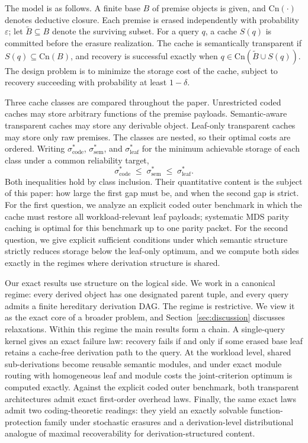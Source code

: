 \documentclass[journal]{IEEEtran}
\newcommand{\Cn}{\text{Cn}}
\numberwithin{equation}{section}
\begin{document}
The model is as follows.  A finite base \(B\) of premise objects is given,
and \(\Cn(\cdot)\) denotes deductive closure.  Each premise is erased
independently with probability \(\varepsilon\); let
\(\widetilde B\subseteq B\) denote the surviving subset.  For a query \(q\),
a cache \(S(q)\) is committed before the erasure realization.  The cache is
semantically transparent if \(S(q)\subseteq\Cn(B)\), and recovery is
successful exactly when \(q\in\Cn(\widetilde B\cup S(q))\).  The design
problem is to minimize the storage cost of the cache, subject to recovery
succeeding with probability at least \(1-\delta\).

Three cache classes are compared throughout the paper.  Unrestricted coded
caches may store arbitrary functions of the premise payloads.
Semantic-aware transparent caches may store any derivable object.
Leaf-only transparent caches may store only raw premises.  The classes are nested, so their optimal
costs are ordered.  Writing \(\sigma_{\mathrm{code}}^{*}\),
\(\sigma_{\mathrm{sem}}^{*}\), and \(\sigma_{\mathrm{leaf}}^{*}\) for the
minimum achievable storage of each class under a common reliability target,
\begin{equation}
  \sigma_{\mathrm{code}}^*
  \;\le\;
  \sigma_{\mathrm{sem}}^*
  \;\le\;
  \sigma_{\mathrm{leaf}}^*.
\label{eq:intro-three-way}
\end{equation}
Both inequalities hold by class inclusion.  Their quantitative content is the
subject of this paper: how large the first gap must be, and when the second
gap is strict.  For the first question, we analyze an explicit coded outer
benchmark in which the cache must restore all workload-relevant leaf
payloads; systematic MDS parity caching is optimal for this benchmark up to
one parity packet.  For the second question, we give explicit sufficient
conditions under which semantic structure strictly reduces storage below the
leaf-only optimum, and we compute both sides exactly in the regimes where
derivation structure is shared.

Our exact results use structure on the logical side.  We work in a canonical
regime: every derived object has one designated parent tuple, and every query
admits a finite hereditary derivation DAG.  The regime is restrictive.  We
view it as the exact core of a broader problem, and
Section~\ref{sec:discussion} discusses relaxations.  
Within this regime the main results form a chain.  A single-query kernel
gives an exact failure law: recovery fails if and only if some erased base
leaf retains a cache-free derivation path to the query.  At the workload
level, shared sub-derivations become reusable semantic modules, and under
exact module routing with homogeneous leaf and module costs the
joint-criterion optimum is computed exactly.  Against the explicit coded
outer benchmark, both transparent architectures admit exact first-order
overhead laws.  Finally, the same exact laws admit two coding-theoretic
readings: they yield an exactly solvable function-protection family under
stochastic erasures and a derivation-level distributional analogue of
maximal recoverability for derivation-structured content.
\end{document}
